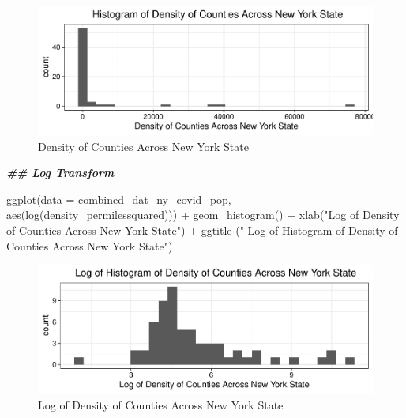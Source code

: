 \documentclass[
  12pt,
]{article}
\newenvironment{Shaded}{\begin{snugshade}}{\end{snugshade}}
\newcommand{\AttributeTok}[1]{\textcolor[rgb]{0.77,0.63,0.00}{#1}}
\newcommand{\DocumentationTok}[1]{\textcolor[rgb]{0.56,0.35,0.01}{\textbf{\textit{#1}}}}
\newcommand{\FunctionTok}[1]{\textcolor[rgb]{0.00,0.00,0.00}{#1}}
\newcommand{\NormalTok}[1]{#1}
\newcommand{\SpecialCharTok}[1]{\textcolor[rgb]{0.00,0.00,0.00}{#1}}
\newcommand{\StringTok}[1]{\textcolor[rgb]{0.31,0.60,0.02}{#1}}
\begin{document}
\begin{figure}

{\centering \includegraphics{EDA_Final_Group_Project_files/figure-latex/unnamed-chunk-10-1} 

}

\caption{Density of Counties Across New York State}\label{fig:unnamed-chunk-10}
\end{figure}

\begin{Shaded}
\begin{Highlighting}[]
\DocumentationTok{\#\# Log Transform}

\FunctionTok{ggplot}\NormalTok{(}\AttributeTok{data =}\NormalTok{ combined\_dat\_ny\_covid\_pop, }\FunctionTok{aes}\NormalTok{(}\FunctionTok{log}\NormalTok{(density\_permilessquared))) }\SpecialCharTok{+}
  \FunctionTok{geom\_histogram}\NormalTok{() }\SpecialCharTok{+}
  \FunctionTok{xlab}\NormalTok{(}\StringTok{"Log of Density of Counties Across New York State"}\NormalTok{) }\SpecialCharTok{+}
  \FunctionTok{ggtitle}\NormalTok{ (}\StringTok{" Log of Histogram of Density of Counties Across New York State"}\NormalTok{)}
\end{Highlighting}
\end{Shaded}

\begin{figure}

{\centering \includegraphics{EDA_Final_Group_Project_files/figure-latex/unnamed-chunk-11-1} 

}

\caption{Log of Density of Counties Across New York State}\label{fig:unnamed-chunk-11}
\end{figure}
\end{document}
